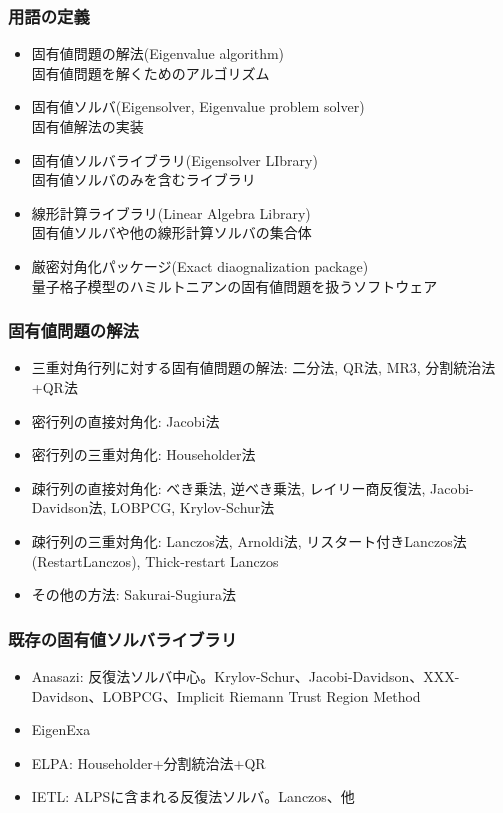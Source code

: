 \begin{frame}
  \frametitle{用語の定義}
  \begin{itemize}
  \item 固有値問題の解法(Eigenvalue algorithm) \\
    固有値問題を解くためのアルゴリズム
  \item 固有値ソルバ(Eigensolver, Eigenvalue problem solver) \\
    固有値解法の実装
  \item 固有値ソルバライブラリ(Eigensolver LIbrary) \\
    固有値ソルバのみを含むライブラリ
  \item 線形計算ライブラリ(Linear Algebra Library) \\
    固有値ソルバや他の線形計算ソルバの集合体
  \item 厳密対角化パッケージ(Exact diaognalization package) \\
    量子格子模型のハミルトニアンの固有値問題を扱うソフトウェア
  \end{itemize}
\end{frame}

\begin{frame}
  \frametitle{固有値問題の解法}
  \begin{itemize}
    \setlength{\itemsep}{1em}
  \item 三重対角行列に対する固有値問題の解法: 二分法, QR法, MR3, 分割統治法+QR法
  \item 密行列の直接対角化: Jacobi法
  \item 密行列の三重対角化: Householder法
  \item 疎行列の直接対角化: べき乗法, 逆べき乗法, レイリー商反復法, Jacobi-Davidson法, LOBPCG, Krylov-Schur法
  \item 疎行列の三重対角化: Lanczos法, Arnoldi法, リスタート付きLanczos法(RestartLanczos), Thick-restart Lanczos
  \item その他の方法: Sakurai-Sugiura法
  \end{itemize}
\end{frame}

\begin{frame}
  \frametitle{既存の固有値ソルバライブラリ}
  \begin{itemize}
  \item Anasazi: 反復法ソルバ中心。Krylov-Schur、Jacobi-Davidson、XXX-Davidson、LOBPCG、Implicit Riemann Trust Region Method
  \item EigenExa
  \item ELPA: Householder+分割統治法+QR
  \item IETL: ALPSに含まれる反復法ソルバ。Lanczos、他
  \end{itemize}
\end{frame}


